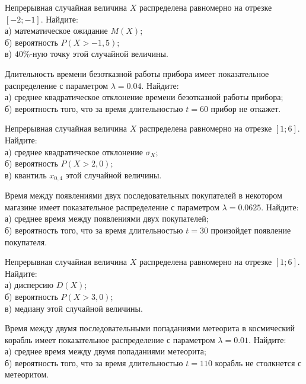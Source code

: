 \vfill

\newpage\setcounter{zad}{0}

\z Непрерывная случайная величина $X$ распределена равномерно на отрезке $[-2; -1]$. Найдите: \\ \quad а) математическое ожидание $M(X)$; \\ \quad б) вероятность $P(X>-1{,}5)$; \\ \quad в) $40\%$-ную точку этой случайной величины.


\vfill

\z Длительность времени безотказной работы прибора имеет показательное распределение с параметром $\lambda = 0.04$. Найдите: \\ \quad а) среднее квадратическое отклонение времени безотказной работы прибора; \\ \quad б) вероятность того, что за время длительностью $t = 60$ прибор не откажет.
 

\vfill

\newpage\setcounter{zad}{0}

\z Непрерывная случайная величина $X$ распределена равномерно на отрезке $[1; 6]$. Найдите: \\ \quad а) среднее квадратическое отклонение $\sigma_X$; \\ \quad б) вероятность $P(X>2{,}0)$; \\ \quad в) квантиль $x_{0{,}4}$ этой случайной величины.


\vfill

\z Время между появлениями двух последовательных покупателей в некотором магазине имеет показательное распределение с параметром $\lambda = 0.0625$. Найдите: \\ \quad а) среднее время между появлениями двух покупателей; \\ \quad б) вероятность того, что за время длительностью $t = 30$  произойдет появление покупателя.
 

\vfill

\newpage\setcounter{zad}{0}

\z Непрерывная случайная величина $X$ распределена равномерно на отрезке $[1; 6]$. Найдите: \\ \quad а) дисперсию $D(X)$; \\ \quad б) вероятность $P(X>3{,}0)$; \\ \quad в) медиану этой случайной величины.


\vfill

\z Время между двумя последовательными попаданиями метеорита в космический корабль имеет показательное распределение с параметром $\lambda = 0.01$. Найдите: \\ \quad а) среднее время между двумя попаданиями метеорита; \\ \quad б) вероятность того, что за время длительностью $t = 110$ корабль не столкнется с метеоритом.
 

